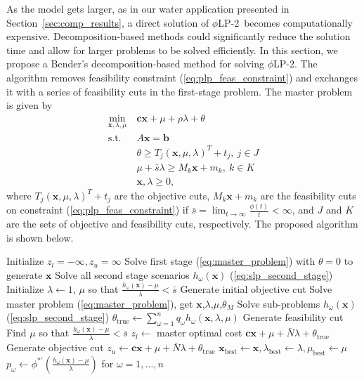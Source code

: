 \documentclass[ijoc,nonblindrev]{informs3} %
\newcommand{\x}{\mathbf{x}}
\renewcommand{\c}{\mathbf{c}}
\renewcommand{\b}{\mathbf{b}}
\newcommand{\st}{\mbox{s.t.}}
\newcommand{\plp}{$\phi$LP-2}
\begin{document}
As the model gets larger, as in our water application presented in Section~\ref{sec:comp_results}, a direct solution of \plp\ becomes computationally expensive. 
Decomposition-based methods could significantly reduce the solution time and allow for larger problems to be solved efficiently. In this section, we propose a Bender's decomposition-based method for solving \plp.
The algorithm removes feasibility constraint (\ref{eq:plp_feas_constraint})  and exchanges it with a series of feasibility cuts in the first-stage problem.
The master problem is given by
\begin{align}
	\min_{\x,\lambda,\mu} \ & \c\x + \mu + \rho \lambda + \theta \label{eq:master_problem}\\
	\st \ & A\x = \b \nonumber \\
	& \theta \geq T_j (\x,\mu,\lambda)^T + t_j, \ j \in J \nonumber \\
	& \mu + \bar{s}\lambda \geq M_k \x + m_k, \ k \in K \nonumber \\
	& \x,\lambda \geq 0, \nonumber
\end{align}
where $T_j (\x,\mu,\lambda)^T + t_j$ are the objective cuts, $M_k \x + m_k$ are the feasibility cuts on constraint (\ref{eq:plp_feas_constraint}) if $\bar{s} = \lim_{t \rightarrow \infty} \frac{\phi(t)}{t} < \infty$, and $J$ and $K$ are the sets of objective and feasibility cuts, respectively.
The proposed algorithm is shown below.

	\begin{algorithmic}
		\State Initialize $z_l = -\infty, z_u = \infty$
		\State Solve first stage (\ref{eq:master_problem}) with $\theta = 0$  to generate $\x$
		\State Solve all second stage scenarios $h_\omega(\x)$ (\ref{eq:slp_second_stage})
		\State Initialize $\lambda \gets 1$, $\mu$ so that $\frac{h_\omega(\x) - \mu}{\lambda} < \bar{s}$
		\State Generate initial objective cut
			\State Solve master problem (\ref{eq:master_problem}), get $\x$,$\lambda$,$\mu$,$\theta_M$
			\State Solve sub-problems $h_\omega(\x)$ (\ref{eq:slp_second_stage})
			\State $\theta_{\text{true}} \gets \sum_{\omega=1}^n q_\omega h_\omega(\x,\lambda,\mu)$
			\If{$\frac{h_\omega(\x) - \mu}{\lambda} > \bar{s}$}
				\State Generate feasibility cut
				\State Find $\mu$ so that $\frac{h_\omega(\x) - \mu}{\lambda} < \bar{s}$
			\Else
				\State $z_l \gets$ master optimal cost $\c\x + \mu + \bar{N}\lambda + \theta_{\text{true}}$
			\EndIf
			\State Generate objective cut
			\If{$\c\x + \mu + \bar{N}\lambda + \theta_{\text{true}} < z_u$}
				\State $z_u \gets \c\x + \mu + \bar{N}\lambda + \theta_{\text{true}}$
				\State $\x_\text{best} \gets \x, \lambda_\text{best} \gets \lambda, \mu_\text{best} \gets \mu$
				\State $p_\omega \gets \phi^{*\prime}(\tfrac{h_\omega(\x) - \mu}{\lambda})$ for $\omega = 1, \dots, n$
			\EndIf
		\EndWhile
	\end{algorithmic}
\end{document}
